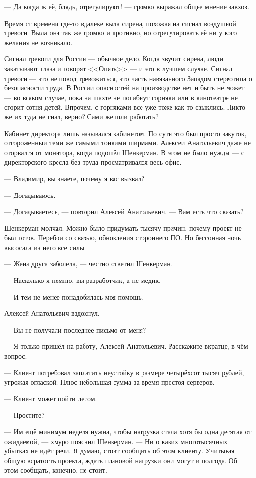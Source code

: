 --- Да когда ж её, блядь, отрегулируют! --- громко выражал общее мнение завхоз.

Время от времени где-то вдалеке выла сирена, похожая на сигнал воздушной тревоги.
Выла она так же громко и противно, но отрегулировать её ни у кого желания не возникало.

Сигнал тревоги для России --- обычное дело.
Когда звучит сирена, люди закатывают глаза и говорят <<Опять>> --- и это в лучшем случае.
Сигнал тревоги --- это не повод тревожиться, это часть навязанного Западом стереотипа о безопасности труда.
В России опасностей на производстве нет и быть не может --- во всяком случае, пока на шахте не погибнут горняки или в кинотеатре не сгорит сотня детей.
Впрочем, с горняками все уже тоже как-то свыклись.
Никто же их туда не гнал, верно?
Сами же шли работать?

Кабинет директора лишь назывался кабинетом.
По сути это был просто закуток, отгороженный теми же самыми тонкими ширмами.
Алексей Анатольевич даже не оторвался от монитора, когда подошёл Шенкерман.
В этом не было нужды --- с директорского кресла без труда просматривался весь офис.

--- Владимир, вы знаете, почему я вас вызвал?

--- Догадываюсь.

--- Догадываетесь, --- повторил Алексей Анатольевич.
--- Вам есть что сказать?

Шенкерман молчал.
Можно было придумать тысячу причин, почему проект не был готов.
Перебои со связью, обновления стороннего ПО.
Но бессонная ночь высосала из него все силы.

--- Жена друга заболела, --- честно ответил Шенкерман.

--- Насколько я помню, вы разработчик, а не медик.

--- И тем не менее понадобилась моя помощь.

Алексей Анатольевич вздохнул.

--- Вы не получали последнее письмо от меня?

--- Я только пришёл на работу, Алексей Анатольевич.
Расскажите вкратце, в чём вопрос.

--- Клиент потребовал заплатить неустойку в размере четырёхсот тысяч рублей, угрожая оглаской.
Плюс небольшая сумма за время простоя серверов.

--- Клиент может пойти лесом.

--- Простите?

--- Им ещё минимум неделя нужна, чтобы нагрузка стала хотя бы одна десятая от ожидаемой, --- хмуро пояснил Шенкерман.
--- Ни о каких многотысячных убытках не идёт речи.
Я думаю, стоит сообщить об этом клиенту.
Учитывая общую всратость проекта, ждать плановой нагрузки они могут и полгода.
Об этом сообщать, конечно, не стоит.

